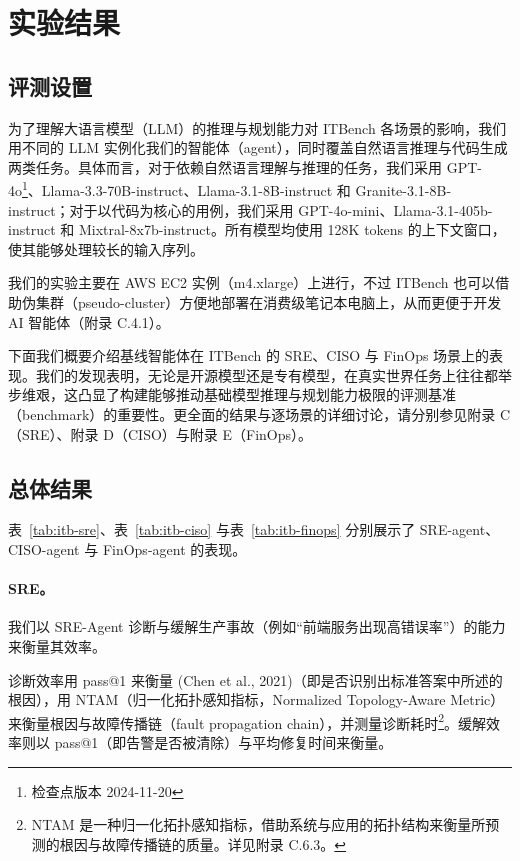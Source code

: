 \section{实验结果}

\subsection{评测设置}

为了理解大语言模型（LLM）的推理与规划能力对 ITBench 各场景的影响，我们用不同的 LLM 实例化我们的智能体（agent），同时覆盖自然语言推理与代码生成两类任务。具体而言，对于依赖自然语言理解与推理的任务，我们采用 GPT-4o\footnote{检查点版本 2024-11-20}、Llama-3.3-70B-instruct、Llama-3.1-8B-instruct 和 Granite-3.1-8B-instruct；对于以代码为核心的用例，我们采用 GPT-4o-mini、Llama-3.1-405b-instruct 和 Mixtral-8x7b-instruct。所有模型均使用 128K tokens 的上下文窗口，使其能够处理较长的输入序列。

我们的实验主要在 AWS EC2 实例（m4.xlarge）上进行，不过 ITBench 也可以借助伪集群（pseudo-cluster）方便地部署在消费级笔记本电脑上，从而更便于开发 AI 智能体（附录 C.4.1）。

下面我们概要介绍基线智能体在 ITBench 的 SRE、CISO 与 FinOps 场景上的表现。我们的发现表明，无论是开源模型还是专有模型，在真实世界任务上往往都举步维艰，这凸显了构建能够推动基础模型推理与规划能力极限的评测基准（benchmark）的重要性。更全面的结果与逐场景的详细讨论，请分别参见附录 C（SRE）、附录 D（CISO）与附录 E（FinOps）。

\subsection{总体结果}

表~\ref{tab:itb-sre}、表~\ref{tab:itb-ciso} 与表~\ref{tab:itb-finops} 分别展示了 SRE-agent、CISO-agent 与 FinOps-agent 的表现。

\paragraph{SRE。} 我们以 SRE-Agent 诊断与缓解生产事故（例如“前端服务出现高错误率”）的能力来衡量其效率。

诊断效率用 pass@1 来衡量 (Chen et al., 2021)（即是否识别出标准答案中所述的根因），用 NTAM（归一化拓扑感知指标，Normalized Topology-Aware Metric）来衡量根因与故障传播链（fault propagation chain），并测量诊断耗时\footnote{NTAM 是一种归一化拓扑感知指标，借助系统与应用的拓扑结构来衡量所预测的根因与故障传播链的质量。详见附录 C.6.3。}。缓解效率则以 pass@1（即告警是否被清除）与平均修复时间来衡量。

